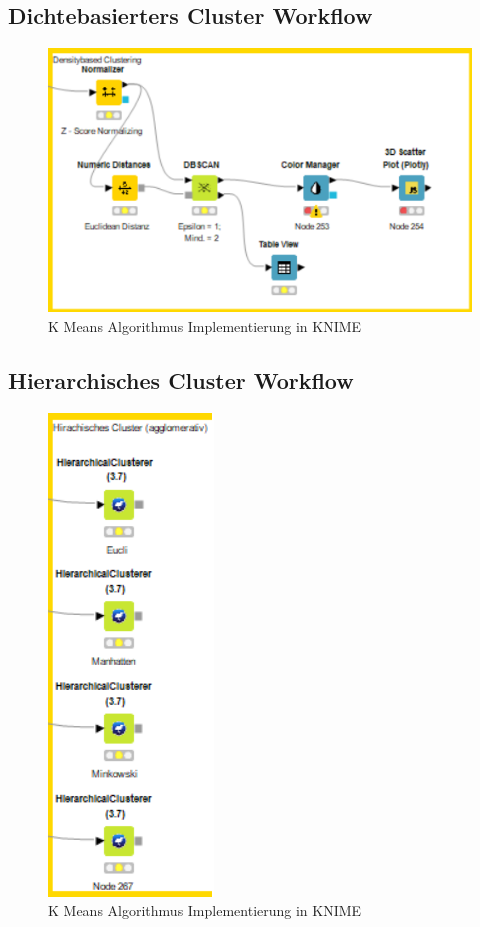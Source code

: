\documentclass[12pt,					%
							 oneside,			%
							 a4paper,			%
							 halfparskip,		%
							 liststotoc,			%
							 bibtotoc,			%
							 fleqn,				%
							 pointlessnumbers]	%
							 {scrreprt}
\begin{document}
		\subsection{Dichtebasierters Cluster Workflow}
		\begin{figure}[!h]
		\includegraphics[scale=1]{pictures/dichte.png}
		\caption{K Means Algorithmus Implementierung in KNIME}
		\end{figure}
		\subsection{Hierarchisches Cluster Workflow}
		\begin{figure}[!h]
		\includegraphics[scale=1]{pictures/hierach.png}
		\caption{K Means Algorithmus Implementierung in KNIME}
		\end{figure}
\end{document}
